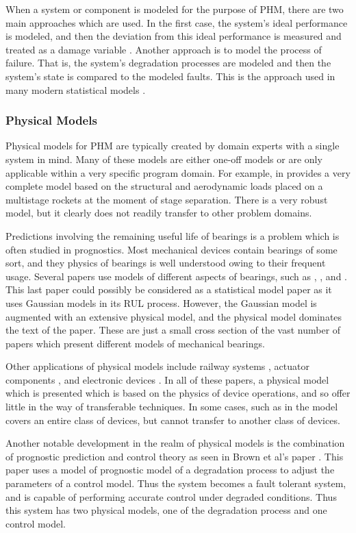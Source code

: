 \documentclass[12pt]{article}
\begin{document}
When a system or component is modeled for the purpose of PHM, there are
two main approaches which are used.  In the first case, the system's ideal
performance is modeled, and then the deviation from this ideal performance is
measured and treated as a damage variable \cite{1569256}.  Another approach is
to model the process of failure.  That is, the system's degradation processes
are modeled and then the system's state is compared to the modeled faults.
This is the approach used in many modern statistical models \cite{4925841}.  

\subsubsection{Physical Models}
Physical models for PHM are typically created by domain experts with a single
system in mind.  Many of these models are either one-off models or are only
applicable within a very specific program domain.  For example, in
\cite{5747595} provides a very complete model based on the structural and
aerodynamic loads placed on a multistage rockets at the moment of stage
separation.  There is a very robust model, but it clearly does not readily
transfer to other problem domains.

Predictions involving the remaining useful life of bearings is a problem which
is often studied in prognostics.  Most mechanical devices contain bearings of
some sort, and they physics of bearings is well understood owing to their
frequent usage.  Several papers use models of different aspects of bearings,
such as \cite{5531344}, \cite{1656121}, and \cite{6299545}.  This last paper
could possibly be considered as a statistical model paper as it uses Gaussian
models in its RUL process.  However, the Gaussian model is augmented with an
extensive physical model, and the physical model dominates the text of the
paper.  These are just a small cross section of the vast number of papers which
present different models of mechanical bearings.

Other applications of physical models include railway systems \cite{5747204},
actuator components \cite{5979041}, and electronic devices \cite{5464512}.  In
all of these papers, a physical model which is presented which is based on the
physics of device operations, and so offer little in the way of transferable
techniques.  In some cases, such as in \cite{5979041} the model covers an
entire class of devices, but cannot transfer to another class of devices.  

Another notable development in the realm of physical models is the combination
of prognostic prediction and control theory as seen in Brown et al's paper
\cite{5547651}.  This paper uses a model of prognostic model of a degradation
process to adjust the parameters of a control model.  Thus the system becomes a
fault tolerant system, and is capable of performing accurate control under
degraded conditions.  Thus this system has two physical models, one of the
degradation process and one control model.
\end{document}
